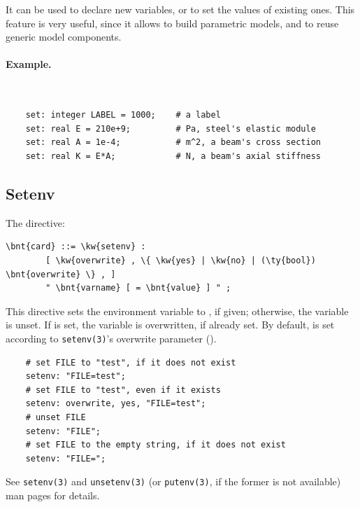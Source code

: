 It can be used to declare new variables, or to set the values
of existing ones.
This feature is very useful, since it allows to build parametric models,
and to reuse generic model components.

\paragraph{Example.} \
\begin{verbatim}
    set: integer LABEL = 1000;    # a label
    set: real E = 210e+9;         # Pa, steel's elastic module
    set: real A = 1e-4;           # m^2, a beam's cross section
    set: real K = E*A;            # N, a beam's axial stiffness
\end{verbatim}



\subsection{Setenv}
The  directive:
\begin{Verbatim}[commandchars=\\\{\}]
    \bnt{card} ::= \kw{setenv} :
        [ \kw{overwrite} , \{ \kw{yes} | \kw{no} | (\ty{bool}) \bnt{overwrite} \} , ]
        " \bnt{varname} [ = \bnt{value} ] " ;
\end{Verbatim}
This directive sets the environment variable  
to , if given; otherwise, the variable
is unset.
If  is set, the variable is overwritten, 
if already set.
By default,  is set according to \texttt{setenv(3)}'s
overwrite parameter (\kw{no}).
\begin{verbatim}
    # set FILE to "test", if it does not exist
    setenv: "FILE=test";
    # set FILE to "test", even if it exists
    setenv: overwrite, yes, "FILE=test";
    # unset FILE
    setenv: "FILE";
    # set FILE to the empty string, if it does not exist
    setenv: "FILE=";
\end{verbatim}
See \texttt{setenv(3)} and \texttt{unsetenv(3)}
(or \texttt{putenv(3)}, if the former is not available)
man pages for details.




